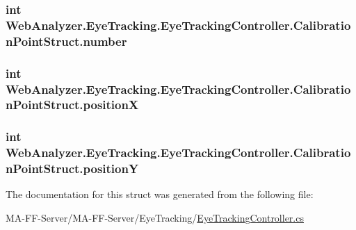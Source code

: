 \subsubsection[{number}]{\setlength{\rightskip}{0pt plus 5cm}int Web\+Analyzer.\+Eye\+Tracking.\+Eye\+Tracking\+Controller.\+Calibration\+Point\+Struct.\+number}\label{struct_web_analyzer_1_1_eye_tracking_1_1_eye_tracking_controller_1_1_calibration_point_struct_a25103a5b9edcc8a34d9e8a50603f42a7}
\hypertarget{struct_web_analyzer_1_1_eye_tracking_1_1_eye_tracking_controller_1_1_calibration_point_struct_ab5839017e5cf4f0903b65489ce851e30}{}
\subsubsection[{position\+X}]{\setlength{\rightskip}{0pt plus 5cm}int Web\+Analyzer.\+Eye\+Tracking.\+Eye\+Tracking\+Controller.\+Calibration\+Point\+Struct.\+position\+X}\label{struct_web_analyzer_1_1_eye_tracking_1_1_eye_tracking_controller_1_1_calibration_point_struct_ab5839017e5cf4f0903b65489ce851e30}
\hypertarget{struct_web_analyzer_1_1_eye_tracking_1_1_eye_tracking_controller_1_1_calibration_point_struct_a81012e692ca9acc6731f971810dabc89}{}
\subsubsection[{position\+Y}]{\setlength{\rightskip}{0pt plus 5cm}int Web\+Analyzer.\+Eye\+Tracking.\+Eye\+Tracking\+Controller.\+Calibration\+Point\+Struct.\+position\+Y}\label{struct_web_analyzer_1_1_eye_tracking_1_1_eye_tracking_controller_1_1_calibration_point_struct_a81012e692ca9acc6731f971810dabc89}


The documentation for this struct was generated from the following file\+:\begin{DoxyCompactItemize}
\item 
M\+A-\/\+F\+F-\/\+Server/\+M\+A-\/\+F\+F-\/\+Server/\+Eye\+Tracking/\hyperlink{_eye_tracking_controller_8cs}{Eye\+Tracking\+Controller.\+cs}\end{DoxyCompactItemize}
